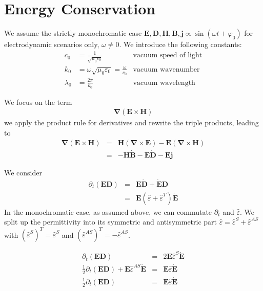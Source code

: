 \documentclass[12pt,a4paper,twoside,openright,BCOR10mm,headsepline,titlepage,abstracton,chapterprefix,final]{scrreprt}
\newcommand\Vector[1]{{\mathbf{#1}}}
\newcommand\vacuum{0}
\newcommand\wavenumber{k}
\newcommand\Nabla{\Vector{\nabla}}
\newcommand\timederivative[1]{\dot{{#1}}}
\newcommand\Tensor[1]{\hat{#1}}
\newcommand\scalarEfield{E}
\newcommand\scalarBfield{B}
\newcommand\scalarHfield{H}
\newcommand\scalarDfield{D}
\newcommand\Efield{\Vector{\scalarEfield}}
\newcommand\Bfield{\Vector{\scalarBfield}}
\newcommand\Hfield{\Vector{\scalarHfield}}
\newcommand\Dfield{\Vector{\scalarDfield}}
\newcommand\vacuumpermeability{\scalarpermeability_{\vacuum}}
\newcommand\scalarpermeability{\mu}
\newcommand\permittivity{\Tensor{\scalarpermittivity}}
\newcommand\vacuumpermittivity{\scalarpermittivity_{\vacuum}}
\newcommand\scalarpermittivity{\varepsilon}
\newcommand\currentdensity{\Vector{j}}
\begin{document}
\section{Energy Conservation}
We assume the strictly monochromatic case $\Efield,\Dfield,\Hfield,\Bfield, \currentdensity \propto \sin(\omega t + \varphi_0)$ for electrodynamic scenarios only, $\omega \neq 0$.
We introduce the following constants:
\begin{align}
 c_\vacuum &= \frac{1}{\sqrt{\vacuumpermeability\vacuumpermittivity}} & \textrm{vacuum speed of light} \\
 \wavenumber_\vacuum &= \omega \sqrt{\vacuumpermeability\vacuumpermittivity} = \frac{\omega}{c_\vacuum}& \textrm{vacuum wavenumber} \\
 \lambda_\vacuum &= \frac{2\pi}{\wavenumber_\vacuum} & \textrm{vacuum wavelength}
\end{align}

We focus on the term
\begin{eqnarray}
   \Nabla ( \Efield \times \Hfield )
\end{eqnarray}
we apply the product rule for derivatives and rewrite the triple products, leading to
\begin{eqnarray}
   \Nabla ( \Efield \times \Hfield ) &=& \Hfield ( \Nabla \times \Efield ) - \Efield ( \Nabla \times \Hfield ) \\
   &=& - \Hfield \timederivative{\Bfield} - \Efield  \timederivative{\Dfield} - \Efield \currentdensity
\end{eqnarray}

We consider
\begin{eqnarray}
 \partial_t (\Efield \Dfield) &=& \Efield  \timederivative{\Dfield} +  \timederivative{\Efield} \Dfield \\
                              &=& \Efield ( \permittivity + \permittivity^T ) \timederivative{\Efield} 
\end{eqnarray}
In the monochromatic case, as assumed above, we can commutate $\partial_t$ and $\permittivity$.
We split up the permittivity into its symmetric and antisymmetric part $\permittivity =  \permittivity^S +  \permittivity^{AS}$ with
$(\permittivity^S)^T = \permittivity^S$ and $(\permittivity^{AS})^T = - \permittivity^{AS}$. 

\begin{eqnarray}
 \partial_t (\Efield \Dfield)                                                                  &=& 2 \Efield \permittivity^S \timederivative{\Efield} \\
 \frac{1}{2} \partial_t (\Efield \Dfield)+ \Efield \permittivity^{AS} \timederivative{\Efield} &=&   \Efield  \permittivity \timederivative{\Efield} \\
 \frac{1}{2} \partial_t (\Efield \Dfield)                                                      &=&   \Efield  \permittivity \timederivative{\Efield}
\end{eqnarray}
\end{document}
